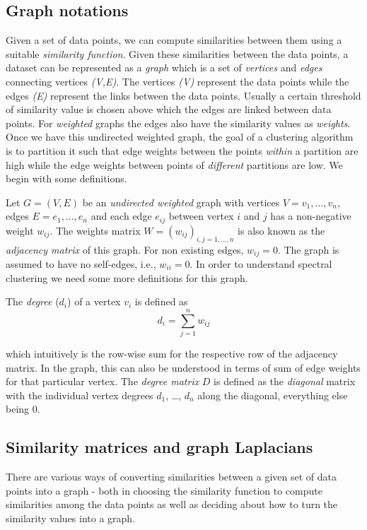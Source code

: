 \subsection{Graph notations}
Given a set of data points, we can compute similarities between them using a suitable \textit{similarity function}. Given these similarities between the data points, a dataset can be represented as a \textit{graph} which is a set of \textit{vertices} and \textit{edges} connecting vertices \textit{(V,E)}. The vertices \textit{(V)} represent the data points while the edges \textit{(E)} represent the links between the data points. Usually a certain threshold of similarity value is chosen above which the edges are linked between data points. For \textit{weighted} graphs the edges also have the similarity values as \textit{weights}. Once we have this undirected weighted graph, the goal of a clustering algorithm is to partition it such that edge weights between the points \textit{within} a partition are high while the edge weights between points of \textit{different} partitions are low. We begin with some definitions.

Let $G = (V,E)$ be an \textit{undirected weighted} graph with vertices $V = {v_{1},\dots,v_{n}}$, edges $E= {e_{1},\dots,e_{n}}$ and each edge $e_{ij}$ between vertex $i$ and $j$  has a non-negative weight $w_{ij}$. The weights matrix $W = (w_{ij})_{i,j=1,\dots,n}$ is also known as the \textit{adjacency matrix} of this graph. For non existing edges, $w_{ij}=0$. The graph is assumed to have no self-edges, i.e., $w_{ii}=0$. In order to understand spectral clustering we need some more definitions for this graph.

The \textit{degree} ($d_{i}$) of a vertex $v_{i}$ is defined as
\[
d_{i} = \sum_{j=1}^{n}w_{ij}
\]

which intuitively is the row-wise sum for the respective row of the adjacency matrix. In the graph, this can also be understood in terms of sum of edge weights for that particular vertex. The \textit{degree matrix} $D$ is defined as the \textit{diagonal} matrix with the individual vertex degrees $d_{1}$, \dots, $d_{n}$ along the diagonal, everything else being $0$.

\subsection{Similarity matrices and graph Laplacians}
There are various ways of converting similarities between a given set of data points into a graph - both in choosing the similarity function to compute similarities 
among the data points as well as deciding about how to turn the similarity values into a graph.

